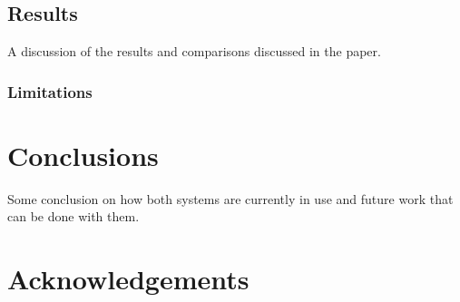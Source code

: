 \documentclass{sig-alternate}
\begin{document}
\subsection{Results}

A discussion of the results and comparisons discussed in the paper.

\subsubsection{Limitations}

\section{Conclusions}

Some conclusion on how both systems are currently in use and future work that can be done with them.

\section{Acknowledgements}



\nocite{Wronski2019, Liba2019}

\nocite{Hasinoff2016, Barron2017}

\nocite{wiki:BayerFilter, wiki:Demosaicing, wiki:Aliasing}

\nocite{blog:Wronski2018, blog:Levoy2018}


  

\end{document}
